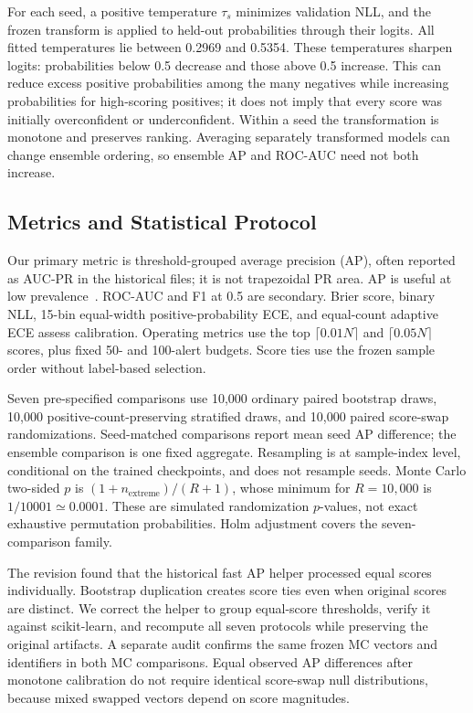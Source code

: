 \documentclass[applsci,article,submit,pdftex,moreauthors]{Definitions/mdpi}
\begin{document}
For each seed, a positive temperature $\tau_s$ minimizes validation NLL, and the frozen transform is applied to held-out probabilities through their logits. All fitted temperatures lie between 0.2969 and 0.5354. These temperatures sharpen logits: probabilities below 0.5 decrease and those above 0.5 increase. This can reduce excess positive probabilities among the many negatives while increasing probabilities for high-scoring positives; it does not imply that every score was initially overconfident or underconfident. Within a seed the transformation is monotone and preserves ranking. Averaging separately transformed models can change ensemble ordering, so ensemble AP and ROC-AUC need not both increase.

\subsection{Metrics and Statistical Protocol}
Our primary metric is threshold-grouped average precision (AP), often reported as AUC-PR in the historical files; it is not trapezoidal PR area. AP is useful at low prevalence~\cite{saito2015precision}. ROC-AUC and F1 at 0.5 are secondary. Brier score, binary NLL, 15-bin equal-width positive-probability ECE, and equal-count adaptive ECE assess calibration. Operating metrics use the top $\lceil0.01N\rceil$ and $\lceil0.05N\rceil$ scores, plus fixed 50- and 100-alert budgets. Score ties use the frozen sample order without label-based selection.

Seven pre-specified comparisons use 10,000 ordinary paired bootstrap draws, 10,000 positive-count-preserving stratified draws, and 10,000 paired score-swap randomizations. Seed-matched comparisons report mean seed AP difference; the ensemble comparison is one fixed aggregate. Resampling is at sample-index level, conditional on the trained checkpoints, and does not resample seeds. Monte Carlo two-sided $p$ is $(1+n_{\mathrm{extreme}})/(R+1)$, whose minimum for $R=10{,}000$ is $1/10001\simeq0.0001$. These are simulated randomization $p$-values, not exact exhaustive permutation probabilities. Holm adjustment covers the seven-comparison family.

The revision found that the historical fast AP helper processed equal scores individually. Bootstrap duplication creates score ties even when original scores are distinct. We correct the helper to group equal-score thresholds, verify it against scikit-learn, and recompute all seven protocols while preserving the original artifacts. A separate audit confirms the same frozen MC vectors and identifiers in both MC comparisons. Equal observed AP differences after monotone calibration do not require identical score-swap null distributions, because mixed swapped vectors depend on score magnitudes.
\end{document}
